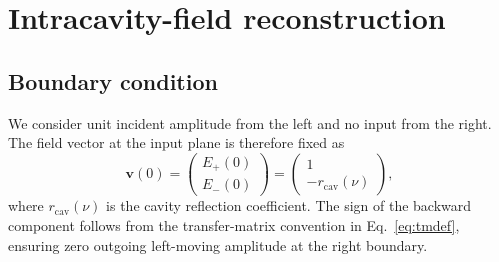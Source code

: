 \documentclass[aps,pra,twocolumn,superscriptaddress,nofootinbib]{revtex4-2}
\begin{document}


\section{Intracavity-field reconstruction}
\label{sec:intracavity}

\subsection{Boundary condition}
We consider unit incident amplitude from the left and no input from the right. 
The field vector at the input plane is therefore fixed as
\begin{equation}
  \mathbf{v}(0)
  =
  \begin{pmatrix} E_+(0) \\ E_-(0) \end{pmatrix}
  =
  \begin{pmatrix} 1 \\ -r_\mathrm{cav}(\nu) \end{pmatrix},
  \label{eq:bc}
\end{equation}
where $r_\mathrm{cav}(\nu)$ is the cavity reflection coefficient. The sign of the backward component follows from the transfer-matrix convention in Eq.~\eqref{eq:tmdef}, ensuring zero outgoing left-moving amplitude at the right boundary.
\end{document}
